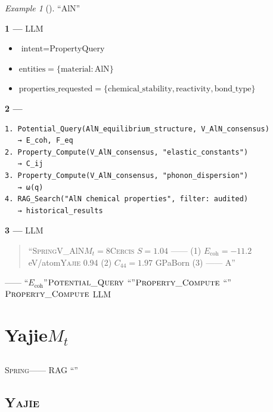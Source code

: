 \documentclass[12pt,a4paper]{article}
\theoremstyle{remark}
\newtheorem{example}[theorem]{Example}
\newcommand{\Spring}{\textsc{Spring}}
\newcommand{\Yajie}{\textsc{Yajie}}
\newcommand{\Cercis}{\textsc{Cercis}}
\begin{document}
\begin{example}[]
\textbf{} “AlN”
\vspace{4pt}

\textbf{1 — }
LLM
\begin{itemize}[nosep]
    \item $\text{intent} = \text{PropertyQuery}$
    \item $\text{entities} = \{\text{material}: \text{AlN}\}$
    \item $\text{properties\_requested} = \{\text{chemical\_stability}, \text{reactivity}, \text{bond\_type}\}$
\end{itemize}

\textbf{2 — }

\begin{verbatim}
1. Potential_Query(AlN_equilibrium_structure, V_AlN_consensus)
   → E_coh, F_eq
2. Property_Compute(V_AlN_consensus, "elastic_constants")  
   → C_ij
3. Property_Compute(V_AlN_consensus, "phonon_dispersion")
   → ω(q)
4. RAG_Search("AlN chemical properties", filter: audited)
   → historical_results
\end{verbatim}

\textbf{3 — }
LLM
\begin{quote}
“\Spring{}V\_AlN$M_t=8$\Cercis{} $S=1.04$
——
(1) $E_{\text{coh}} = -11.2$ eV/atom\Yajie{} 0.94
(2) $C_{44} = 1.97$ GPaBorn
(3) ——
A”
\end{quote}

——
“$E_{\text{coh}}$”$\textsc{Potential\_Query}$
“”$\textsc{Property\_Compute}$
“”$\textsc{Property\_Compute}$
LLM
\end{example}

\newpage

\section{Yajie$M_t$}

\subsection{}

\Spring{}\textbf{}——
RAG
“”

\subsection{\Yajie{}}
\end{document}
